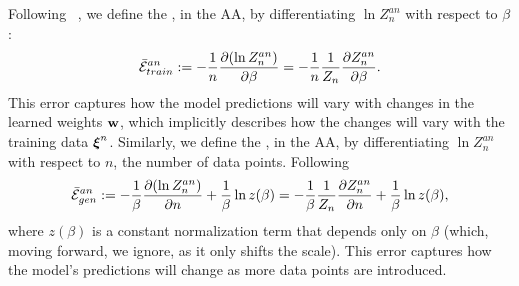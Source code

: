 Following ~\cite{LTS90, Solla2023},
we define the \emph{\AverageTrainingError}, in the AA,
by differentiating $\ln Z^{an}_{n}$ with respect to $\beta$:
\begin{align}
  \label{eqn:avgte_def}
  \bar{\mathcal{E}}_{train}^{an}
  := -\frac{1}{n}\dfrac{\partial (\ln Z^{an}_{n})}{\partial \beta} 
  = -\frac{1}{n}\frac{1}{Z_{n}}\dfrac{\partial Z^{an}_{n}}{\partial \beta} .
\end{align}
This error captures how the model predictions will vary with changes in the learned
weights ${\mathbf{w}}$, which implicitly describes how the changes will vary with the
training data $\boldsymbol{\xi}^{n}$.
%
Similarly, 
we define the \emph{\AverageGeneralizationError}, in the AA,
by differentiating $\ln Z^{an}_{n}$ with respect to $n$, the number of data points.
Following 
\begin{align}
  \label{eqn:avgge_def}
  \bar{\mathcal{E}}_{gen}^{an}
  := -\frac{1}{\beta}\dfrac{\partial (\ln Z^{an}_{n})}{\partial n}    +\frac{1}{\beta}\ln z(\beta)  
  =  -\frac{1}{\beta}\frac{1}{Z_{n}}\dfrac{\partial Z^{an}_{n}}{\partial n}
  +\frac{1}{\beta}\ln z(\beta) ,
\end{align}
where $z(\beta)$ is a constant normalization term that depends only on $\beta$ (which, moving forward, we ignore, as it only shifts the scale).
This error captures how the model’s predictions will change as more data points are introduced.

